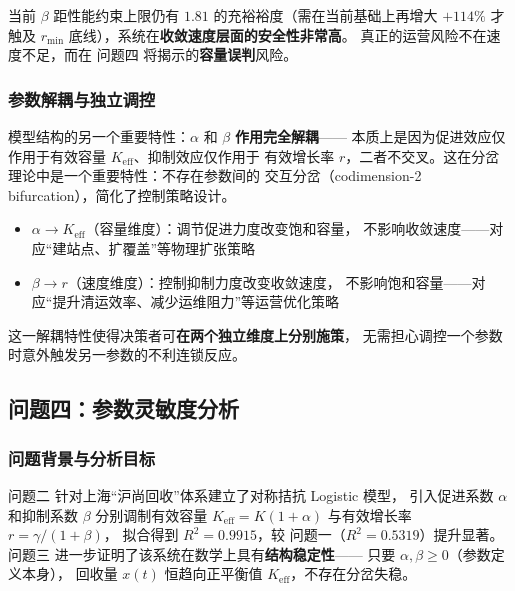 \documentclass[12pt,a4paper]{ctexart}
\begin{document}
\begin{table}[htbp]
当前 $\beta$ 距性能约束上限仍有 $1.81$ 的充裕裕度（需在当前基础上再增大
$+114\%$ 才触及 $r_{\min}$ 底线），系统在\textbf{收敛速度层面的安全性非常高}。
真正的运营风险不在速度不足，而在 问题四 将揭示的\textbf{容量误判}风险。

\subsubsection{参数解耦与独立调控}

模型结构的另一个重要特性：$\alpha$ 和 $\beta$ \textbf{作用完全解耦}——
本质上是因为促进效应仅作用于有效容量 $K_{\text{eff}}$、抑制效应仅作用于
有效增长率 $r$，二者不交叉。这在分岔理论中是一个重要特性：不存在参数间的
交互分岔（codimension-2 bifurcation），简化了控制策略设计。
\begin{itemize}
  \item $\alpha \to K_{\text{eff}}$（容量维度）：调节促进力度改变饱和容量，
        不影响收敛速度——对应``建站点、扩覆盖''等物理扩张策略
  \item $\beta \to r$（速度维度）：控制抑制力度改变收敛速度，
        不影响饱和容量——对应``提升清运效率、减少运维阻力''等运营优化策略
\end{itemize}

这一解耦特性使得决策者可\textbf{在两个独立维度上分别施策}，
无需担心调控一个参数时意外触发另一参数的不利连锁反应。

\subsection{问题四：参数灵敏度分析}

\subsubsection{问题背景与分析目标}

问题二 针对上海``沪尚回收''体系建立了对称拮抗 Logistic 模型，
引入促进系数 $\alpha$ 和抑制系数 $\beta$ 分别调制有效容量 $K_{\text{eff}} = K(1+\alpha)$
与有效增长率 $r = \gamma/(1+\beta)$，
拟合得到 $R^2 = 0.9915$，较 问题一（$R^2 = 0.5319$）提升显著。
问题三 进一步证明了该系统在数学上具有\textbf{结构稳定性}——
只要 $\alpha, \beta \geq 0$（参数定义本身），
回收量 $x(t)$ 恒趋向正平衡值 $K_{\text{eff}}$，不存在分岔失稳。


\end{table}
\end{document}
